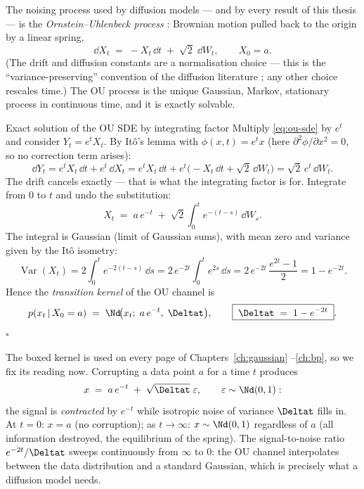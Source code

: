 The noising process used by diffusion models --- and by every result of this
thesis --- is the \emph{Ornstein--Uhlenbeck process}
\citep{uhlenbeck1930theory}: Brownian motion pulled back to the origin by a
linear spring,
\begin{equation}
  \dd X_t \;=\; -X_t\,\dd t \;+\; \sqrt{2}\;\dd W_t ,
  \qquad X_0 = a .
  \label{eq:ou-sde}
\end{equation}
(The drift and diffusion constants are a normalisation choice --- this is
the ``variance-preserving'' convention of the diffusion literature
\citep{song2021scorebased}; any other choice rescales time.) The OU process
is the unique Gaussian, Markov, stationary process in continuous time, and
it is exactly solvable.

\begin{toolbox}{Exact solution of the OU SDE by integrating factor}
Multiply \eqref{eq:ou-sde} by $e^{t}$ and consider
$Y_t = e^{t} X_t$. By It\^o's lemma with $\phi(x,t) = e^{t}x$ (here
$\partial^2 \phi/\partial x^2 = 0$, so no correction term arises):
\begin{equation*}
  \dd Y_t
  = e^{t} X_t\,\dd t + e^{t}\,\dd X_t
  = e^{t} X_t\,\dd t + e^{t}\big( -X_t\,\dd t + \sqrt{2}\,\dd W_t \big)
  = \sqrt{2}\, e^{t}\, \dd W_t .
\end{equation*}
The drift cancels exactly --- that is what the integrating factor is for.
Integrate from $0$ to $t$ and undo the substitution:
\begin{equation*}
  X_t \;=\; a\, e^{-t} \;+\; \sqrt{2} \int_0^t e^{-(t-s)}\, \dd W_s .
\end{equation*}
The integral is Gaussian (limit of Gaussian sums), with mean zero and
variance given by the It\^o isometry:
\begin{equation*}
  \operatorname{Var}(X_t)
  = 2 \int_0^t e^{-2(t-s)}\, \dd s
  = 2\, e^{-2t} \int_0^t e^{2s}\, \dd s
  = 2\, e^{-2t}\, \frac{e^{2t} - 1}{2}
  = 1 - e^{-2t} .
\end{equation*}
Hence the \emph{transition kernel} of the OU channel is
\begin{equation*}
  p(x_t \,|\, X_0 = a)
  \;=\; \Nd\!\big( x_t;\; a\,e^{-t},\; \Deltat \big),
  \qquad
  \boxed{\;\Deltat \;=\; 1 - e^{-2t}\;} .
\end{equation*}
\hfill$\square$
\end{toolbox}

The boxed kernel is used on every page of Chapters~\ref{ch:gaussian}
--\ref{ch:bp}, so we fix its reading now. Corrupting a data point $a$ for a
time $t$ produces
\begin{equation}
  x \;=\; a\, e^{-t} \;+\; \sqrt{\Deltat}\;\varepsilon,
  \qquad \varepsilon \sim \Nd(0, 1):
  \label{eq:ou-channel}
\end{equation}
the signal is \emph{contracted} by $e^{-t}$ while isotropic noise of
variance $\Deltat$ fills in. At $t = 0$: $x = a$ (no corruption); as
$t \to \infty$: $x \sim \Nd(0, 1)$ regardless of $a$ (all information
destroyed, the equilibrium of the spring). The signal-to-noise ratio
$e^{-2t}/\Deltat$ sweeps continuously from $\infty$ to $0$: the OU channel
interpolates between the data distribution and a standard Gaussian, which is
precisely what a diffusion model needs.

